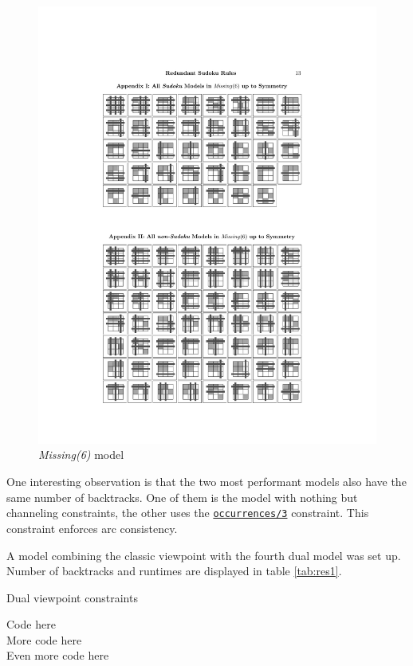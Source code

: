 \begin{figure}[H]
\centering
\includegraphics{misc/missing6}
\caption{\textit{Missing(6)} model}
\label{fig:missing6}
\end{figure}

One interesting observation is that the two most performant models also have the same number of backtracks. One of them is the model with nothing but channeling constraints, the other uses the \href{http://eclipseclp.org/doc/bips/lib/ic_global/occurrences-3.html}{\texttt{occurrences/3}} constraint. This constraint enforces arc consistency.\\\par

A model combining the classic viewpoint with the fourth dual model was set up. Number of backtracks and runtimes are displayed in table \ref{tab:res1}.

\begin{algorithm}[H]
\caption{Dual viewpoint constraints}\label{channeling}
\small
Code here\\
More code here\\
Even more code here
\end{algorithm}

